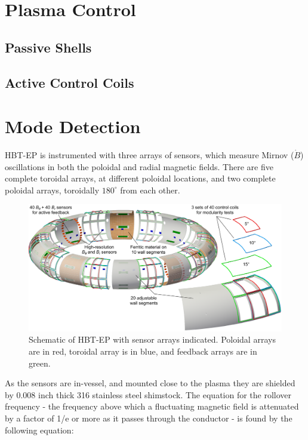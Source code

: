 \section{Plasma Control}
\subsection{Passive Shells}
\subsection{Active Control Coils}
\section{Mode Detection}
HBT-EP is instrumented with three arrays of sensors, which measure Mirnov ($\dot{B}$) oscillations in both the poloidal and radial magnetic fields.  There are five complete toroidal arrays, at different poloidal locations, and two complete poloidal arrays, toroidally $180^{\circ}$ from each other.

\begin{figure}
\includegraphics[width = \textwidth]{./figures/Plasma_with_sensors_FWall_concept_WithCCview.png}\begin{flushleft}
\caption{Schematic of HBT-EP with sensor arrays indicated.  Poloidal arrays are in red, toroidal array is in blue, and feedback arrays are in green.}
\end{flushleft}
\label{PA_sensors}
\end{figure}

As the sensors are in-vessel, and mounted close to the plasma they are shielded by 0.008 inch thick 316 stainless steel shimstock.  The equation for the rollover frequency - the frequency above which a fluctuating magnetic field is attenuated by a factor of 1/e or more as it passes through the conductor - is found by the following equation:

